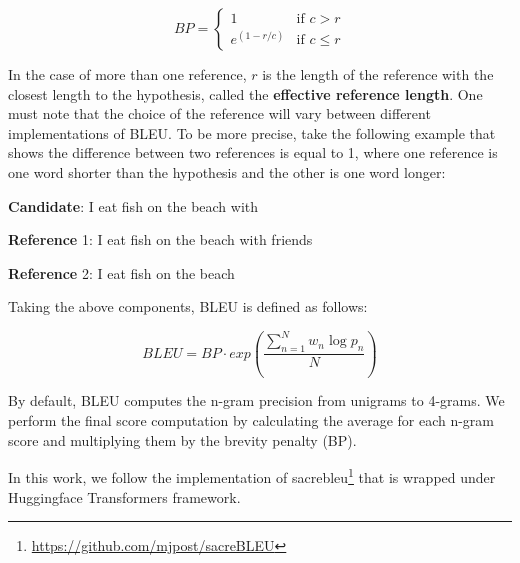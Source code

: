\begin{equation}
    BP=\begin{cases} 1 & \mbox{if } c>r \\ e^{(1-r/c)} & \mbox{if } c\le r \end{cases}
\end{equation}

In the case of more than one reference, $r$ is the length of the reference with the closest length to the hypothesis, called the \textbf{effective reference length}. One must note that the choice of the reference will vary between different implementations of BLEU. To be more precise, take the following example that shows the difference between two references is equal to 1, where one reference is one word shorter than the hypothesis and the other is one word longer:

\bigskip

\textbf{Candidate}: I eat fish on the beach with

\textbf{Reference} 1: I eat fish on the beach with friends

\textbf{Reference} 2: I eat fish on the beach

\bigskip

Taking the above components, BLEU is defined as follows:

\begin{equation}
    BLEU=BP\cdot exp\left( \frac{\sum_{n=1}^{N} w_n \log p_n}{N} \right)
\end{equation}

By default, BLEU computes the n-gram precision from unigrams to 4-grams. We perform the final score computation by calculating the average for each n-gram score and multiplying them by the brevity penalty (BP).

In this work, we follow the implementation of sacrebleu\footnote{\url{https://github.com/mjpost/sacreBLEU}}  that is wrapped under Huggingface Transformers framework.